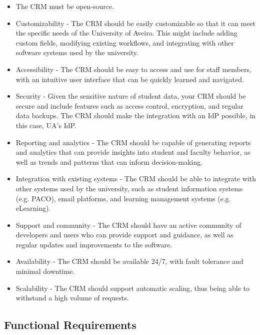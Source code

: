 \documentclass{article}
\begin{document}
\begin{itemize}

    \item The CRM must be open-source.
    \item Customizability - The CRM should be easily customizable so that it can meet the specific needs of the University of Aveiro. This might include adding custom fields, modifying existing workflows, and integrating with other software systems used by the university.
    \item Accessibility - The CRM should be easy to access and use for staff members, with an intuitive user interface that can be quickly learned and navigated.
    \item Security - Given the sensitive nature of student data, your CRM should be secure and include features such as access control, encryption, and regular data backups. The CRM should make the integration with an IdP possible, in this case, UA's IdP.
    \item Reporting and analytics - The CRM should be capable of generating reports and analytics that can provide insights into student and faculty behavior, as well as trends and patterns that can inform decision-making.
    \item Integration with existing systems - The CRM should be able to integrate with other systems used by the university, such as student information systems (e.g. PACO), email platforms, and learning management systems (e.g. eLearning).
    \item Support and community - The CRM should have an active community of developers and users who can provide support and guidance, as well as regular updates and improvements to the software.
    \item Availability - The CRM should be available 24/7, with fault tolerance and minimal downtime.
    \item Scalability - The CRM should support automatic scaling, thus being able to withstand a high volume of requests.

\end{itemize}

\subsection{Functional Requirements}
\end{document}
